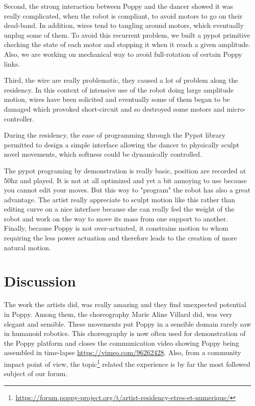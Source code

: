 \begin{figure}[]
\centering
    \hfil
    \caption{}
    \label{fig:broken_poppy_residency}
\end{figure}

Second, the strong interaction between Poppy and the dancer showed it was really complicated, when the robot is compliant, to avoid motors to go on their dead-band. In addition, wires tend to tangling around motors, which eventually unplug some of them. To avoid this recurrent problem, we built a pypot primitive checking the state of each motor and stopping it when it reach a given amplitude. Also, we are working on mechanical way to avoid full-rotation of certain Poppy links.

Third, the wire are really problematic, they caused a lot of problem along the residency. In this context of intensive use of the robot doing large amplitude motion, wires have been solicited and eventually some of them began to be damaged which provoked short-circuit and so destroyed some motors and micro-controller.

During the residency, the ease of programming through the Pypot library permitted to design a simple interface allowing the dancer to physically sculpt novel movements, which softness could be dynamically controlled.

The pypot programing by demonstration is really basic, position are recorded at 50hz and played. It is not at all optimized and yet a bit annoying to use because you cannot edit your moves. But this way to "program" the robot has also a great advantage. The artist really appreciate to sculpt motion like this rather than editing curve on a nice interface because she can really feel the weight of the robot and work on the way to move its mass from one support to another. Finally, because Poppy is not over-actuated, it constrains motion to whom requiring the less power actuation and therefore leads to the creation of more natural motion.


\section{Discussion} %

The work the artists did, was really amazing and they find unexpected potential in Poppy. Among them, the choreography Marie Aline Villard did, was very elegant and sensible. These movements put Poppy in a sensible domain rarely saw in humanoid robotics. This choreography is now often used for demonstration of the Poppy platform and closes the communication video showing Poppy being assembled in time-lapse \url{https://vimeo.com/96262428}.
Also, from a community impact point of view, the topic\footnote{\url{https://forum.poppy-project.org/t/artist-residency-etres-et-numerique/}} related the experience is by far the most followed subject of our forum.

